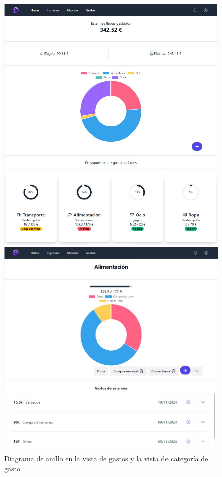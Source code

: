 \begin{figure}[ht!]
    \centering
    \begin{minipage}{0.45\textwidth}
        \centering
        \includegraphics[width=\linewidth]{imagenes/M3-gastos.jpg}
    \end{minipage}\hfill
    \begin{minipage}{0.45\textwidth}
        \centering
        \includegraphics[width=\linewidth]{imagenes/M3-gastos-categoria.jpg}
    \end{minipage}
    \caption{Diagrama de anillo en la vista de gastos y la vista de categoría de gasto}
    \label{fig:doughnut_chart}
\end{figure}

